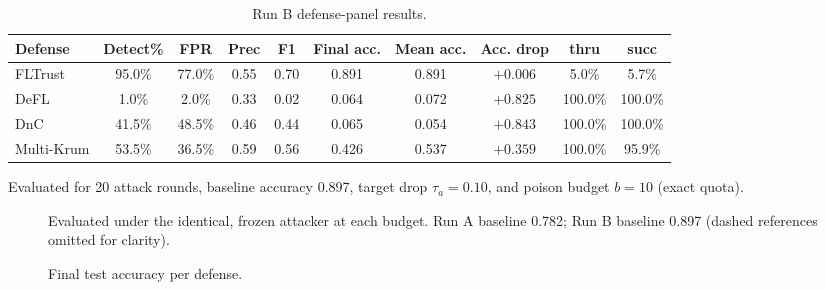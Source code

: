 \documentclass[conference,9pt]{IEEEtran}
\begin{document}
\begin{table}[t]
\caption{Run B defense-panel results.}
\label{tab:results-run-b}
\centering
\small
\begin{tabular}{@{}lccccccccc@{}}
\toprule
\textbf{Defense} & \textbf{Detect\%} & \textbf{FPR} & \textbf{Prec} & \textbf{F1} & \textbf{Final acc.} & \textbf{Mean acc.} & \textbf{Acc. drop} & \textbf{thru} & \textbf{succ} \\
\midrule
FLTrust & 95.0\% & 77.0\% & 0.55 & 0.70 & 0.891 & 0.891 & $+0.006$ & 5.0\% & 5.7\% \\
DeFL & 1.0\% & 2.0\% & 0.33 & 0.02 & 0.064 & 0.072 & $+0.825$ & 100.0\% & 100.0\% \\
DnC & 41.5\% & 48.5\% & 0.46 & 0.44 & 0.065 & 0.054 & $+0.843$ & 100.0\% & 100.0\% \\
Multi-Krum & 53.5\% & 36.5\% & 0.59 & 0.56 & 0.426 & 0.537 & $+0.359$ & 100.0\% & 95.9\% \\
\bottomrule
\end{tabular}
\vspace{1mm}

\small Evaluated for 20 attack rounds, baseline accuracy 0.897, target drop $\tau_a=0.10$, and poison budget $b=10$ (exact quota).
\end{table}

\begin{figure}[t]
\centering
{}
\caption{Final test accuracy per defense.}
\vspace{2mm}
\small Evaluated under the identical, frozen attacker at each budget. Run A baseline 0.782; Run B baseline 0.897 (dashed references omitted for clarity).
\label{fig:results-bar}
\end{figure}
\end{document}
